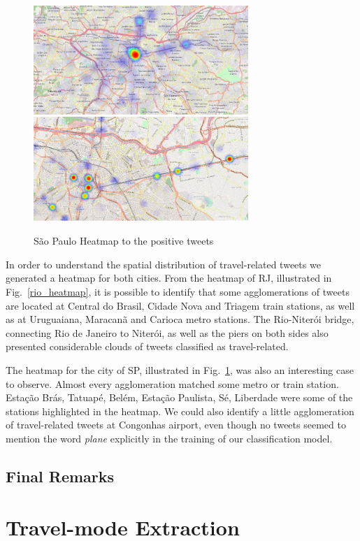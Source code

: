 \begin{figure}[h]
  \caption{São Paulo Heatmap to the positive tweets}
  \centering
    \includegraphics[width=0.725\textwidth]{figures/sp_1}
    \label{sp_heatmap}
\end{figure}

In order to understand the spatial distribution of travel-related tweets we generated a heatmap for both cities. From the heatmap of RJ, illustrated in Fig.~\ref{rio_heatmap}, it is possible to identify that some agglomerations of tweets are located at Central do Brasil, Cidade Nova and Triagem train stations, as well as at Uruguaiana, Maracanã and Carioca metro stations. The Rio-Niterói bridge, connecting Rio de Janeiro to Niterói, as well as the piers on both sides also presented considerable clouds of tweets classified as travel-related.

The heatmap for the city of SP, illustrated in Fig.~\ref{sp_heatmap}, was also an interesting case to observe. Almost every agglomeration matched some metro or train station. Estação Brás, Tatuapé, Belém, Estação Paulista, Sé, Liberdade were some of the stations highlighted in the heatmap. We could also identify a little agglomeration of travel-related tweets at Congonhas airport, even though no tweets seemed to mention the word \textit{plane} explicitly in the training of our classification model.

\subsection{Final Remarks}

\section{Travel-mode Extraction}\label{sec:travel_mode_extraction}
